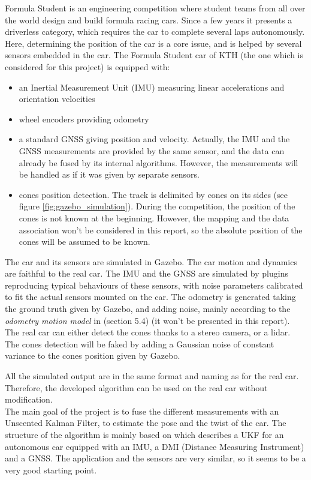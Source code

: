 \documentclass[10pt,a4paper, twocolumn]{article}
\begin{document}
Formula Student is an engineering competition where student teams from all over the world design and build formula racing cars. Since a few years it presents a driverless category, which requires the car to complete several laps autonomously. Here, determining the position of the car is a core issue, and is helped by several sensors embedded in the car. The Formula Student car of KTH (the one which is considered for this project) is equipped with:
\begin{itemize}
	\item an Inertial Measurement Unit (IMU) measuring linear accelerations and orientation velocities
	\item wheel encoders providing odometry
	\item a standard GNSS giving position and velocity. Actually, the IMU and the GNSS measurements are provided by the same sensor, and the data can already be fused by its internal algorithms. However, the measurements will be handled as if it was given by separate sensors.
	\item cones position detection. The track is delimited by cones on its sides (see figure \ref{fig:gazebo_simulation}). During the competition, the position of the cones is not known at the beginning. However, the mapping and the data association won't be considered in this report, so the absolute position of the cones will be assumed to be known.
\end{itemize}

The car and its sensors are simulated in Gazebo. The car motion and dynamics are faithful to the real car. The IMU and the GNSS are simulated by plugins reproducing typical behaviours of these sensors, with noise parameters calibrated to fit the actual sensors mounted on the car. The odometry is generated taking the ground truth given by Gazebo, and adding noise, mainly according to the \textit{odometry motion model} in \cite{ProbabilisticRobotics} (section 5.4) (it won't be presented in this report). The real car can either detect the cones thanks to a stereo camera, or a lidar. The cones detection will be faked by adding a Gaussian noise of constant variance to the cones position given by Gazebo. 

All the simulated output are in the same format and naming as for the real car. Therefore, the developed algorithm can be used on the real car without modification.\\

The main goal of the project is to fuse the different measurements with an Unscented Kalman Filter, to estimate the pose and the twist of the car. The structure of the algorithm is mainly based on \cite{RobustVehicleLocalization} which describes a UKF for an autonomous car equipped with an IMU, a DMI (Distance Measuring Instrument) and a GNSS. The application and the sensors are very similar, so it seems to be a very good starting point.
\end{document}
